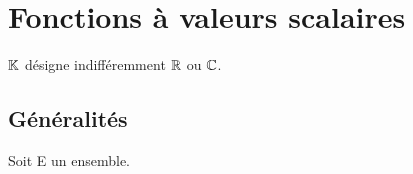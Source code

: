 \section{Fonctions à valeurs scalaires}

\vspace{0.5cm}

\begin{center}
    \( \mathbb{K}\) désigne indifféremment \(\mathbb{R}\) ou \(\mathbb{C}\).
\end{center}

\subsection{Généralités}

\vspace{0.2cm}

\begin{center}
Soit E un ensemble. 
\end{center}

\vspace{0.6cm}

